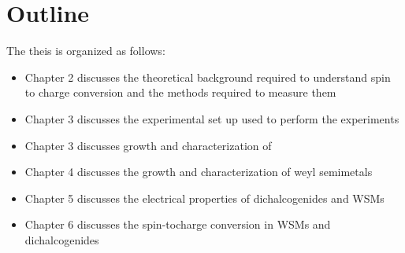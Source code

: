 \section{Outline}
The theis is organized as follows:

\begin{itemize}
    \item Chapter 2 discusses the theoretical background required to 
    understand spin to charge conversion and the methods required to measure them
    \item Chapter 3 discusses the experimental set up used to perform the experiments
    \item Chapter 3 discusses growth and characterization of \nbse
    \item Chapter 4 discusses the growth and characterization of weyl semimetals
    \item Chapter 5 discusses the electrical properties of dichalcogenides and WSMs
    \item Chapter 6 discusses the spin-tocharge conversion in WSMs and dichalcogenides
\end{itemize}
